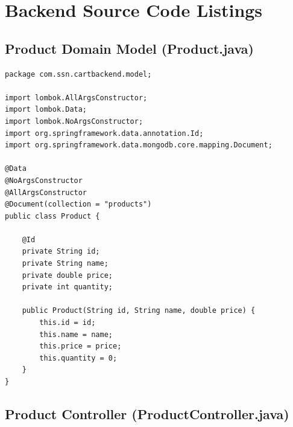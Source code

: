 \documentclass[12pt,a4paper]{article}
\begin{document}
\section{Backend Source Code Listings}

\subsection{Product Domain Model (Product.java)}

\begin{lstlisting}[style=javastyle, caption={Product.java: Model containing ID, Name, Price, and Quantity}]
package com.ssn.cartbackend.model;

import lombok.AllArgsConstructor;
import lombok.Data;
import lombok.NoArgsConstructor;
import org.springframework.data.annotation.Id;
import org.springframework.data.mongodb.core.mapping.Document;

@Data
@NoArgsConstructor
@AllArgsConstructor
@Document(collection = "products")
public class Product {

    @Id
    private String id;
    private String name;
    private double price;
    private int quantity;

    public Product(String id, String name, double price) {
        this.id = id;
        this.name = name;
        this.price = price;
        this.quantity = 0;
    }
}
\end{lstlisting}

\subsection{Product Controller (ProductController.java)}
\end{document}
